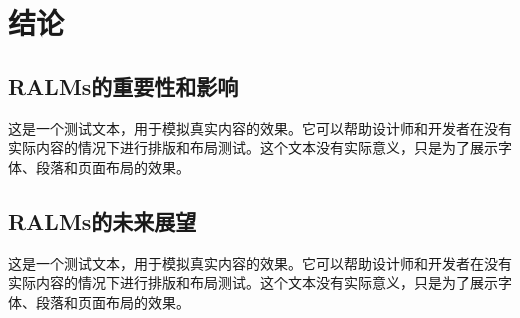
\chapter{结论}

\section{RALMs的重要性和影响}

这是一个测试文本，用于模拟真实内容的效果。它可以帮助设计师和开发者在没有实际内容的情况下进行排版和布局测试。这个文本没有实际意义，只是为了展示字体、段落和页面布局的效果。

\section{RALMs的未来展望}

这是一个测试文本，用于模拟真实内容的效果。它可以帮助设计师和开发者在没有实际内容的情况下进行排版和布局测试。这个文本没有实际意义，只是为了展示字体、段落和页面布局的效果。
